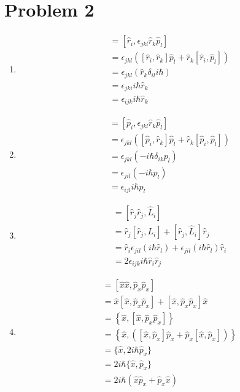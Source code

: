 \documentclass[12pt]{article}
\begin{document}
\section*{Problem 2}
\begin{enumerate}
\item \begin{align*}[\hat r_i,\hat L_j] &= [\hat r_i,\epsilon_{jkl}\hat r_k\hat p_l]\\
&= \epsilon_{jkl} ([\hat r_i,\hat r_k]\hat p_l + \hat r_k[\hat r_i,\hat p_l])\\
&= \epsilon_{jkl} (\hat r_k \delta_{il}i\hbar)\\
&= \epsilon_{jki}i\hbar\hat r_k\\
&= \epsilon_{ijk}i\hbar\hat r_k
\end{align*}
\item \begin{align*}
[\hat p_i,\hat L_j] &= [\hat p_i,\epsilon_{jkl}\hat r_k\hat p_l]\\
&= \epsilon_{jkl} ([\hat p_i,\hat r_k]\hat p_l + \hat r_k[\hat p_i,\hat p_l])\\
&=\epsilon_{jkl}(-i\hbar\delta_{ik}p_l)\\
&=\epsilon_{jil}(-i\hbar p_l)\\
&=\epsilon_{ijl}i\hbar p_l
\end{align*}
\item \begin{align*}
[\mathbf r \cdot \mathbf r,\hat L_i] &= [\hat r_j\hat r_j,\hat L_i]\\
&=\hat r_j[\hat r_j,L_i] + [\hat r_j,\hat L_i]\hat r_j\\
&= \hat r_i\epsilon_{jil}(i\hbar\hat r_l) + \epsilon_{jil}(i\hbar\hat r_l)\hat r_i\\
&= 2\epsilon_{ijk}i\hbar\hat r_i\hat r_j
\end{align*}
\item \begin{align*}
[\hat x^2,\hat p_x^2] &= [\hat x \hat x, \hat p_x\hat p_x]\\
&= \hat x[\hat x,\hat p_x\hat p_x]+[\hat x,\hat p_x\hat p_x]\hat x\\
&=\left\{\hat x,[\hat x,\hat p_x\hat p_x] \right\}\\
&=\left\{\hat x,([\hat x,\hat p_x]\hat p_x +\hat p_x[\hat x,\hat p_x])\right\}\\
&=\{\hat x, 2i\hbar\hat p_x\}\\
&=2i\hbar \{\hat x,\hat p_x\}\\
&= 2i\hbar (\hat x\hat p_x +\hat p_x\hat x)
\end{align*}
\end{enumerate}
\end{document}
